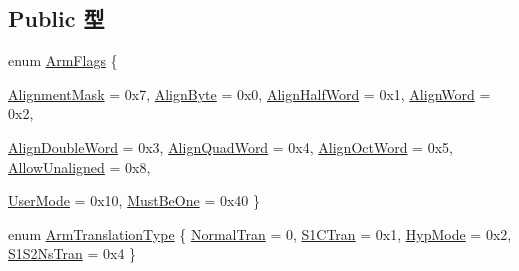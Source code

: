 \subsection*{Public 型}
\begin{DoxyCompactItemize}
\item 
enum \hyperlink{classArmISA_1_1TLB_a1e31c6b4a233c7e98a3e85eba0c84f0d}{ArmFlags} \{ \par
\hyperlink{classArmISA_1_1TLB_a1e31c6b4a233c7e98a3e85eba0c84f0da811bb3ddcc5035211e497b863db3abd0}{AlignmentMask} =  0x7, 
\hyperlink{classArmISA_1_1TLB_a1e31c6b4a233c7e98a3e85eba0c84f0da46a23507e5cc78facbca4f0aadb6106d}{AlignByte} =  0x0, 
\hyperlink{classArmISA_1_1TLB_a1e31c6b4a233c7e98a3e85eba0c84f0da78d8dffe4cfc46c93a011f6c18eb342f}{AlignHalfWord} =  0x1, 
\hyperlink{classArmISA_1_1TLB_a1e31c6b4a233c7e98a3e85eba0c84f0da7aed72b8cf399f281ad8558187fe6941}{AlignWord} =  0x2, 
\par
\hyperlink{classArmISA_1_1TLB_a1e31c6b4a233c7e98a3e85eba0c84f0dad6e82eb48377344b7d9f32c3a488dc0e}{AlignDoubleWord} =  0x3, 
\hyperlink{classArmISA_1_1TLB_a1e31c6b4a233c7e98a3e85eba0c84f0da9323e858587f025242511a85b969b287}{AlignQuadWord} =  0x4, 
\hyperlink{classArmISA_1_1TLB_a1e31c6b4a233c7e98a3e85eba0c84f0da9adcd9ee14d498ddb978852cae60d840}{AlignOctWord} =  0x5, 
\hyperlink{classArmISA_1_1TLB_a1e31c6b4a233c7e98a3e85eba0c84f0dac6aa9917fe5880558d8ee22e2fbcbe58}{AllowUnaligned} =  0x8, 
\par
\hyperlink{classArmISA_1_1TLB_a1e31c6b4a233c7e98a3e85eba0c84f0dadcfc57d389e8e2bb30dc32135b6a92d0}{UserMode} =  0x10, 
\hyperlink{classArmISA_1_1TLB_a1e31c6b4a233c7e98a3e85eba0c84f0daf6e40c9fd5825f3b3a4f2d45d4a64c68}{MustBeOne} =  0x40
 \}
\item 
enum \hyperlink{classArmISA_1_1TLB_ad6f5d480df151d5bddeefc6271793f08}{ArmTranslationType} \{ \hyperlink{classArmISA_1_1TLB_ad6f5d480df151d5bddeefc6271793f08af17d21db71fd885f6cc71fb2d0e896ec}{NormalTran} =  0, 
\hyperlink{classArmISA_1_1TLB_ad6f5d480df151d5bddeefc6271793f08a4ed07d4f5bb408945e5f4e9c7333b2d3}{S1CTran} =  0x1, 
\hyperlink{classArmISA_1_1TLB_ad6f5d480df151d5bddeefc6271793f08ae447e872ded0e6da22f91d2ccaf66afd}{HypMode} =  0x2, 
\hyperlink{classArmISA_1_1TLB_ad6f5d480df151d5bddeefc6271793f08ab8e7d202ad511f74c201e2bca94e83d6}{S1S2NsTran} =  0x4
 \}
\end{DoxyCompactItemize}
